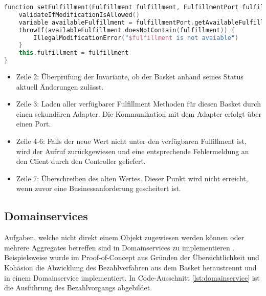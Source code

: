 \begin{minipage}{\linewidth} %
	\begin{lstlisting}[caption={Setzen der Fulfillment Methode im Basket Aggregate}, label={lst:basket}, language=Kotlin]
function setFulfillment(Fulfillment fulfillment, FulfillmentPort fulfillmentPort) {
	validateIfModificationIsAllowed()
	variable availableFulfillment = fulfillmentPort.getAvailableFulfillment(outletId)
	throwIf(availableFulfillment.doesNotContain(fulfillment)) {
		IllegalModificationError("$fulfillment is not avaiable")
	}
	this.fulfillment = fulfillment
}
	\end{lstlisting}


	\begin{itemize}[noitemsep,nolistsep]
		\item Zeile 2: Überprüfung der Invariante, ob der Basket anhand seines Status aktuell Änderungen zulässt.
		\item Zeile 3: Laden aller verfügbarer Fulfillment Methoden für diesen Basket durch einen sekundären Adapter. Die Kommunikation mit dem Adapter erfolgt über einen Port.
		\item Zeile 4-6: Falls der neue Wert nicht unter den verfügbaren Fulfillment ist, wird der Aufruf zurückgewiesen und eine entsprechende Fehlermeldung an den Client durch den Controller geliefert.
		\item Zeile 7: Überschreiben des alten Wertes. Dieser Punkt wird nicht erreicht, wenn zuvor eine Businessanforderung gescheitert ist.
	\end{itemize}
\end{minipage}

\subsection{Domainservices}

Aufgaben, welche nicht direkt einem Objekt zugewiesen werden können oder mehrere Aggregates betreffen sind in Domainservices zu implementieren \cite[S. 267]{Vernon.2015}. Beispielsweise wurde im Proof-of-Concept aus Gründen der Übersichtlichkeit und Kohäsion die Abwicklung des Bezahlverfahren aus dem Basket heraustrennt und in einem Domainservice implementiert. In Code-Ausschnitt \ref{lst:domainservice} ist die Ausführung des Bezahlvorgangs abgebildet. 

